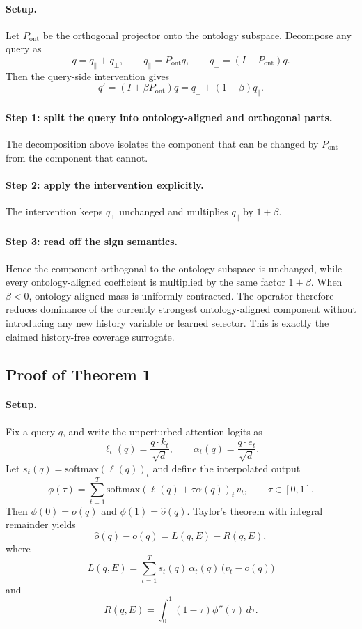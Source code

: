 \paragraph{Setup.}
Let $P_{\mathrm{ont}}$ be the orthogonal projector onto the ontology subspace. Decompose any query as
\[
q = q_{\parallel} + q_{\perp},
\qquad
q_{\parallel}=P_{\mathrm{ont}}q,
\qquad
q_{\perp}=(I-P_{\mathrm{ont}})q.
\]
Then the query-side intervention gives
\[
q'=(I+\beta P_{\mathrm{ont}})q
= q_{\perp} + (1+\beta) q_{\parallel}.
\]

\paragraph{Step 1: split the query into ontology-aligned and orthogonal parts.}
The decomposition above isolates the component that can be changed by $P_{\mathrm{ont}}$ from the component that cannot.

\paragraph{Step 2: apply the intervention explicitly.}
The intervention keeps $q_{\perp}$ unchanged and multiplies $q_{\parallel}$ by $1+\beta$.

\paragraph{Step 3: read off the sign semantics.}
Hence the component orthogonal to the ontology subspace is unchanged, while every ontology-aligned coefficient is multiplied by the same factor $1+\beta$. When $\beta<0$, ontology-aligned mass is uniformly contracted. The operator therefore reduces dominance of the currently strongest ontology-aligned component without introducing any new history variable or learned selector. This is exactly the claimed history-free coverage surrogate.

\subsection{Proof of Theorem 1}

\paragraph{Setup.}
Fix a query $q$, and write the unperturbed attention logits as
\[
\ell_t(q)=\frac{q\cdot k_t}{\sqrt d},
\qquad
\alpha_t(q)=\frac{q\cdot e_t}{\sqrt d}.
\]
Let $s_t(q)=\mathrm{softmax}(\ell(q))_t$ and define the interpolated output
\[
\phi(\tau)=\sum_{t=1}^{T}\mathrm{softmax}(\ell(q)+\tau \alpha(q))_t\,v_t,
\qquad \tau\in[0,1].
\]
Then $\phi(0)=o(q)$ and $\phi(1)=\hat o(q)$. Taylor's theorem with integral remainder yields
\[
\hat o(q)-o(q)=L(q,E)+R(q,E),
\]
where
\[
L(q,E)=\sum_{t=1}^{T}s_t(q)\,\alpha_t(q)\,\bigl(v_t-o(q)\bigr)
\]
and
\[
R(q,E)=\int_{0}^{1}(1-\tau)\phi''(\tau)\,d\tau.
\]

